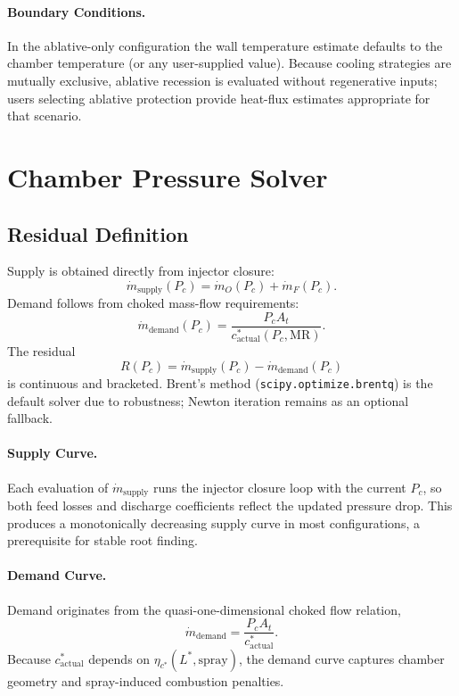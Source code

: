 \documentclass[12pt]{article}
\begin{document}
\paragraph{Boundary Conditions.}  In the ablative-only configuration the wall temperature estimate defaults to the chamber temperature (or any user-supplied value).  Because cooling strategies are mutually exclusive, ablative recession is evaluated without regenerative inputs; users selecting ablative protection provide heat-flux estimates appropriate for that scenario.

\section{Chamber Pressure Solver}
\label{sec:chamber}

\subsection{Residual Definition}
Supply is obtained directly from injector closure:
\[
\dot{m}_{\text{supply}}(P_c) = \dot{m}_O(P_c) + \dot{m}_F(P_c).
\]
Demand follows from choked mass-flow requirements:
\[
\dot{m}_{\text{demand}}(P_c) = \frac{P_c A_t}{c^*_{\text{actual}}(P_c,\text{MR})}.
\]
The residual
\[
R(P_c) = \dot{m}_{\text{supply}}(P_c) - \dot{m}_{\text{demand}}(P_c)
\]
is continuous and bracketed.  Brent's method (\verb|scipy.optimize.brentq|) is the default solver due to robustness; Newton iteration remains as an optional fallback.

\paragraph{Supply Curve.}  Each evaluation of $\dot{m}_{\text{supply}}$ runs the injector closure loop with the current $P_c$, so both feed losses and discharge coefficients reflect the updated pressure drop.  This produces a monotonically decreasing supply curve in most configurations, a prerequisite for stable root finding.

\paragraph{Demand Curve.}  Demand originates from the quasi-one-dimensional choked flow relation,
\[
\dot{m}_{\text{demand}} = \frac{P_c A_t}{c^*_{\text{actual}}}.
\]
Because $c^*_{\text{actual}}$ depends on $\eta_{c^*}(L^*, \text{spray})$, the demand curve captures chamber geometry and spray-induced combustion penalties.
\end{document}
